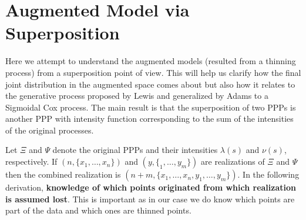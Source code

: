 \documentclass{article}
\newcommand{\ls}{\lambda(s)}
\newcommand{\ns}{\nu(s)}
\begin{document}
	\section{Augmented Model via Superposition}
	Here we attempt to understand the augmented models (resulted from a thinning process) from a superposition point of view. This will help us clarify how the final joint distribution in the augmented space comes about but also how it relates to the generative process proposed by Lewis and generalized by Adams to a Sigmoidal Cox process. The main result is that the superposition of two \glspl{PPP} is another \gls{PPP} with intensity function corresponding to the sum of the intensities of the original processes.
	
	Let $\Xi$ and $\Psi$ denote the original \glspl{PPP} and their intensities $\ls$ and $\ns$, respectively. If $(n, \{x_1, \ldots, x_n\})$ and $(y, \{_1, \ldots, y_m\})$ are realizations of $\Xi$ and $\Psi$  then the combined realization is $(n + m, \{x_1, \ldots, x_n, y_1, \ldots, y_m \})$.   In the following derivation, \textbf{knowledge of which points originated from which realization is assumed lost}. This is important as in our case we do  know which points are part of the data and which ones are thinned points. 
	
\end{document}
